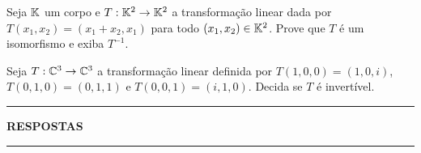 \documentclass[12pt]{exam}
\begin{document}
\begin{exercicio}
  Seja $\mathbb{K}$ um corpo e $T : \mathbb{K}^2 \to \mathbb{K}^2$ a transformação linear dada por $T(x_1,x_2) = (x_1 + x_2, x_1)$ para todo $(x_1,x_2) \in \mathbb{K}^2$. Prove que $T$ é um isomorfismo e exiba $T^{-1}$.
\end{exercicio}

\begin{exercicio}
  Seja $T : \mathbb{C}^3 \to \mathbb{C}^3$ a transformação linear definida por $T(1,0,0) = (1,0,i)$, $T(0,1,0) = (0,1,1)$ e $T(0,0,1) = (i,1,0)$. Decida se $T$ é invertível.
\end{exercicio}

\newpage
{}
\hrule
\begin{center}
  {\large\bf RESPOSTAS}
\end{center}
\hrule

\end{document}
